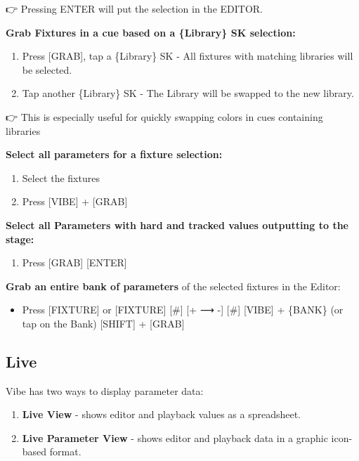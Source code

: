 \documentclass[
]{article}
\providecommand{\tightlist}{%
  \setlength{\itemsep}{0pt}\setlength{\parskip}{0pt}}
\begin{document}
👉 Pressing ENTER will put the selection in the EDITOR.

\textbf{Grab Fixtures in a cue based on a \{Library\} SK selection:}

\begin{enumerate}
\def\labelenumi{\arabic{enumi}.}
\item
  Press {[}GRAB{]}, tap a \{Library\} SK - All fixtures with matching libraries will be selected.
\item
  Tap another \{Library\} SK - The Library will be swapped to the new library.
\end{enumerate}

👉 This is especially useful for quickly swapping colors in cues containing libraries

\textbf{Select all parameters for a fixture selection:}

\begin{enumerate}
\def\labelenumi{\arabic{enumi}.}
\item
  Select the fixtures
\item
  Press {[}VIBE{]} + {[}GRAB{]}
\end{enumerate}

\textbf{Select all Parameters with hard and tracked values outputting to the stage:}

\begin{enumerate}
\def\labelenumi{\arabic{enumi}.}
\tightlist
\item
  Press {[}GRAB{]} {[}ENTER{]}
\end{enumerate}

\textbf{Grab an entire bank of parameters} of the selected fixtures in the Editor:

\begin{itemize}
\tightlist
\item
  Press {[}FIXTURE{]} or {[}FIXTURE{]} {[}\#{]} {[}+ ⟶ -{]} {[}\#{]} {[}VIBE{]} + \{BANK\} (or tap on the Bank) {[}SHIFT{]} + {[}GRAB{]}
\end{itemize}

\hypertarget{Live-7.4}{%
\subsection{Live}\label{Live-7.4}}

Vibe has two ways to display parameter data:

\begin{enumerate}
\def\labelenumi{\arabic{enumi}.}
\item
  \textbf{Live View} - shows editor and playback values as a spreadsheet.
\item
  \textbf{Live Parameter View} - shows editor and playback data in a graphic icon-based format.
\end{enumerate}
\end{document}

